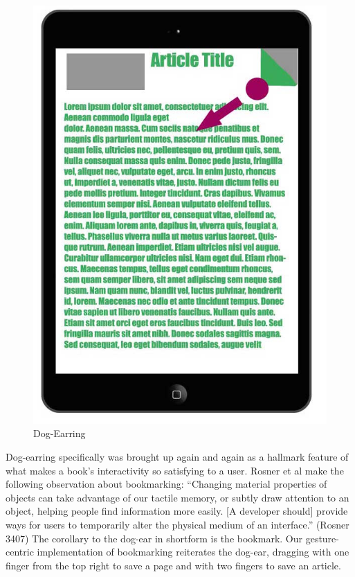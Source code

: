 \documentclass[11pt, oneside]{article}   	%
\begin{document}
\begin{figure}[!hb]
    \centering
    \includegraphics[scale=0.3]{dog-ear.jpg}
    \caption{Dog-Earring}
    \label{fig:dog-earring}
\end{figure}


Dog-earring specifically was brought up again and again as a hallmark feature of what makes a book's interactivity so satisfying to a user. Rosner et al make the following observation about bookmarking: ``Changing material properties of objects can take advantage of our tactile memory, or subtly draw attention to an object, helping people find information more easily. [A developer should] provide ways for users to temporarily alter the physical medium of an interface.'' (Rosner 3407) The corollary to the dog-ear in shortform is the bookmark. Our gesture-centric implementation of bookmarking reiterates the dog-ear, dragging with one finger from the top right to save a page and with two fingers to save an article.
\end{document}
